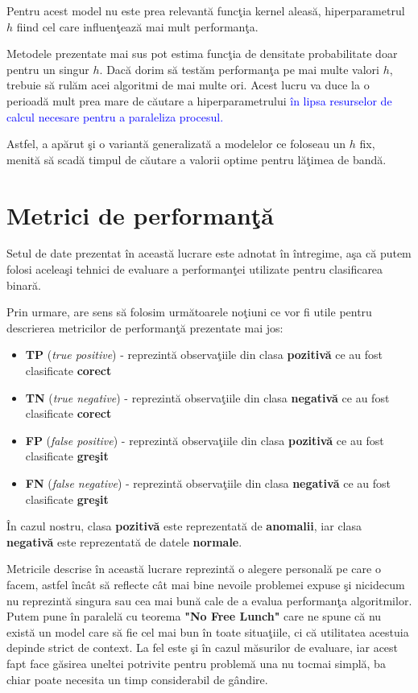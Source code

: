 Pentru acest model nu este prea relevantă funcţia kernel aleasă, 
hiperparametrul $h$ fiind cel care influenţează mai mult performanţa.

Metodele 
prezentate mai sus pot estima funcţia de densitate probabilitate doar 
pentru un singur $h$. Dacă dorim să testăm performanţa pe mai multe valori $h$, 
trebuie să rulăm acei algoritmi de mai multe ori. Acest lucru va duce la o perioadă 
mult prea mare de căutare a hiperparametrului \textcolor{blue}
{în lipsa resurselor de calcul necesare 
pentru a paraleliza procesul.}

Astfel, a apărut şi o variantă generalizată a modelelor ce foloseau un 
$h$ fix, menită să scadă timpul de căutare a valorii optime pentru lăţimea 
de bandă\cite{Rapid-KDE}.

\section{Metrici de performanţă}

Setul de date prezentat în această lucrare este adnotat în întregime, aşa 
că putem folosi aceleaşi tehnici de evaluare a performanţei utilizate pentru
clasificarea binară.

Prin urmare, are sens să folosim următoarele noţiuni ce vor fi utile pentru
descrierea metricilor de performanţă prezentate mai jos:

\begin{itemize}
    \item \textbf{TP} (\textit{true positive}) - reprezintă observaţiile din clasa 
    \textbf{pozitivă} ce au fost clasificate \textbf{corect}
    \item \textbf{TN} (\textit{true negative}) - reprezintă observaţiile din clasa 
    \textbf{negativă} ce au fost clasificate \textbf{corect}
    \item \textbf{FP} (\textit{false positive}) - reprezintă observaţiile din clasa 
    \textbf{pozitivă} ce au fost clasificate \textbf{greşit}
    \item \textbf{FN} (\textit{false negative}) - reprezintă observaţiile din clasa 
    \textbf{negativă} ce au fost clasificate \textbf{greşit}
\end{itemize}
În cazul nostru, clasa \textbf{pozitivă} este reprezentată de \textbf{anomalii}, iar 
clasa \textbf{negativă} este reprezentată de datele \textbf{normale}.

Metricile descrise în această lucrare reprezintă o alegere personală pe care o facem, astfel
încât să reflecte cât mai bine nevoile problemei expuse şi nicidecum nu reprezintă singura
sau cea mai bună cale de a evalua performanţa algoritmilor. Putem pune în paralelă cu teorema
\textbf{"No Free Lunch"} care ne spune că nu există un model care să fie cel mai bun în toate situaţiile,
ci că utilitatea acestuia depinde strict de context. La fel este şi în cazul măsurilor de evaluare,
iar acest fapt face găsirea uneltei potrivite pentru problemă una nu tocmai simplă, ba chiar 
poate necesita un timp considerabil de gândire.

